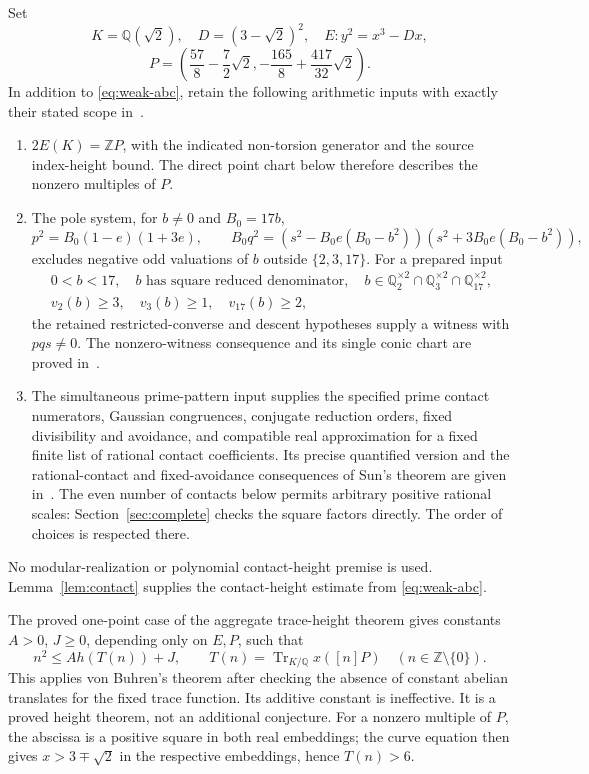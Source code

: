 \documentclass[11pt,a4paper]{article}
\newcommand{\Q}{\mathbb Q}\newcommand{\Z}{\mathbb Z}
\DeclareMathOperator{\Tr}{Tr}\DeclareMathOperator{\rad}{rad}
\begin{document}
Set
\[
 K=\Q(\sqrt2),\quad D=(3-\sqrt2)^2,\quad
 E:y^2=x^3-Dx,
\]
\[
 P=\left(\frac{57}{8}-\frac72\sqrt2,
                 -\frac{165}{8}+\frac{417}{32}\sqrt2\right).
\]
In addition to \eqref{eq:weak-abc}, retain the following arithmetic inputs with
exactly their stated scope in~\cite{Dependencies,Source27}.
\begin{enumerate}
\item $2E(K)=\Z P$, with the indicated non-torsion generator
and the source index-height bound. The direct point chart below
therefore describes the nonzero multiples of $P$.
\item The pole system, for $b\ne0$ and $B_0=17b$,
\[
 p^2=B_0(1-e)(1+3e),\qquad
 B_0q^2=(s^2-B_0e(B_0-b^2))(s^2+3B_0e(B_0-b^2)),
\]
excludes negative odd valuations of $b$ outside $\{2,3,17\}$.
For a prepared input
\begin{equation}\label{eq:prepared}
 \begin{gathered}
 0<b<17,\quad b\text{ has square reduced denominator},\quad
 b\in\Q_2^{\times2}\cap\Q_3^{\times2}\cap\Q_{17}^{\times2},\\
 v_2(b)\ge3,\quad v_3(b)\ge1,\quad v_{17}(b)\ge2,
 \end{gathered}
\end{equation}
the retained restricted-converse and descent hypotheses supply a
witness with $pqs\ne0$. The nonzero-witness consequence and its
single conic chart are proved in~\cite[Lemma~2]{Source27}.
\item The simultaneous prime-pattern input supplies the specified
prime contact numerators, Gaussian congruences, conjugate reduction
orders, fixed divisibility and avoidance, and compatible real
approximation for a fixed finite list of rational contact coefficients.
Its precise quantified version and the rational-contact and fixed-avoidance
consequences of Sun's theorem are given in~\cite{Dependencies}.
The even number of contacts below permits arbitrary positive rational
scales: Section~\ref{sec:complete} checks the square factors directly.
The order of choices is respected there.
\end{enumerate}
No modular-realization or polynomial contact-height premise is used.
Lemma~\ref{lem:contact} supplies the contact-height estimate from
\eqref{eq:weak-abc}.

The proved one-point case of the aggregate trace-height theorem
\cite{Trace} gives constants $A>0$, $J\ge0$, depending only on
$E,P$, such that
\begin{equation}\label{eq:traceheight}
 n^2\le A h(T(n))+J,\qquad
 T(n)=\Tr_{K/\Q}x([n]P)\quad(n\in\Z\setminus\{0\}).
\end{equation}
This applies von Buhren's theorem after checking the absence of
constant abelian translates for the fixed trace function. Its additive
constant is ineffective. It is a proved height theorem, not an
additional conjecture. For a nonzero multiple of $P$, the abscissa
is a positive square in both real embeddings; the curve equation
then gives $x>3\mp\sqrt2$ in the respective embeddings, hence
$T(n)>6$.
\end{document}
